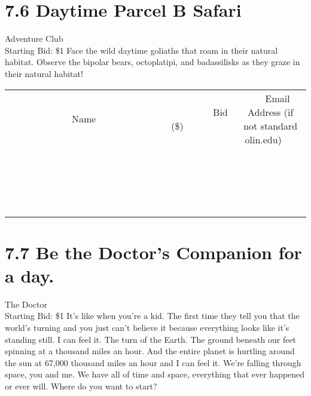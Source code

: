 \documentclass[11pt]{article}
\begin{document}
\section*{7.6 Daytime Parcel B Safari}
Adventure Club
\\
Starting Bid: \$1
\newline
Face the wild daytime goliaths that roam in their natural habitat. Observe the bipolar bears, octoplatipi, and badassilisks as they graze in their natural habitat!
\\[3ex]
\begin{tabular}{c c c}
~~~~~~~~~~~~~Name~~~~~~~~~~~~~ & ~~~~~~~~~Bid (\$)~~~~~~~~~  & ~~~Email Address (if not standard olin.edu)~~~\\
 & & \\
\hline
 & & \\
\hline
 & & \\
\hline
 & & \\
\hline
 & & \\
\hline
 & & \\
\hline
 & & \\
\hline
 & & \\
\hline
 & & \\
\hline
 & & \\
\hline
 & & \\
\hline
 & & \\
\hline
 & & \\
\hline
 & & \\
\hline
 & & \\
\hline
 & & \\
\hline
 & & \\
\hline
 & & \\
\hline
 & & \\
\hline
\end{tabular}
\newpage
\section*{7.7 Be the Doctor's Companion for a day.}
The Doctor
\\
Starting Bid: \$1
\newline
It's like when you're a kid. The first time they tell you that the world's turning and you just can't believe it because everything looks like it's standing still. I can feel it. The turn of the Earth. The ground beneath our feet spinning at a thousand miles an hour. And the entire planet is hurtling around the sun at 67,000 thousand miles an hour and I can feel it. We're falling through space, you and me. 
We have all of time and space, everything that ever happened or ever will. Where do you want to start?
\end{document}
